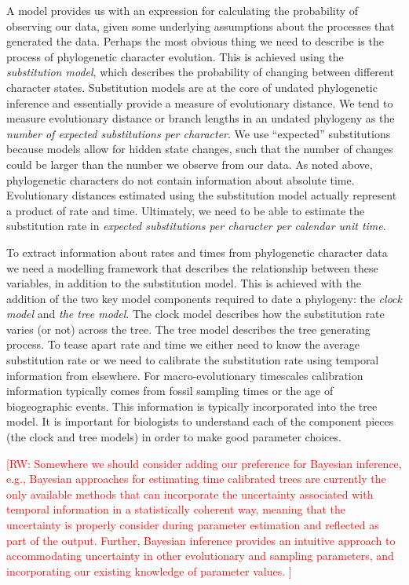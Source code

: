 \documentclass[11pt]{article}
\newcommand\blankpage{%
    \null
    \thispagestyle{empty}%
    \addtocounter{page}{-1}%
    \newpage}
\newcommand{\rw}[1]{{\textcolor{red}{[RW: #1]}}} %
\begin{document}
A model provides us with an expression for calculating the probability of observing our data, given some underlying assumptions about the processes that generated the data. 
Perhaps the most obvious thing we need to describe is the process of phylogenetic character evolution.
This is achieved using the \textit{substitution model}, which describes the probability of changing between different character states.
Substitution models are at the core of undated phylogenetic inference and essentially provide a measure of evolutionary distance.
We tend to measure evolutionary distance or branch lengths in an undated phylogeny as the \textit{number of expected substitutions per character}. We use ``expected'' substitutions because models allow for hidden state changes, such that the number of changes could be larger than the number we observe from our data.
As noted above, phylogenetic characters do not contain information about absolute time. Evolutionary distances estimated using the substitution model actually represent a product of rate and time.
Ultimately, we need to be able to estimate the substitution rate in \textit{expected substitutions per character per calendar unit time}.

To extract information about rates and times from phylogenetic character data we need a modelling framework that describes the  relationship between these variables, in addition to the substitution model.
This is achieved with the addition of the two key model components required to date a phylogeny: the \textit{clock model} and \textit{the tree model}.
The clock model describes how the substitution rate varies (or not) across the tree.
The tree model describes the tree generating process.
To tease apart rate and time we either need to know the average substitution rate or we need to calibrate the substitution rate using temporal information from elsewhere.
For macro-evolutionary timescales calibration information typically comes from fossil sampling times or the age of biogeographic events. This information is typically incorporated into the tree model.
It is important for biologists to understand each of the component pieces (the clock and tree models) in order to make good parameter choices.

\clearpage
\afterpage{\blankpage}


\rw{Somewhere we should consider adding our preference for Bayesian inference, e.g., Bayesian approaches 
for estimating time calibrated trees are currently the only available methods that can incorporate the uncertainty associated with temporal information in a statistically coherent way, meaning that the uncertainty is properly consider during parameter estimation and reflected as part of the output.
Further, Bayesian inference provides an intuitive approach to accommodating uncertainty in other evolutionary and sampling parameters, and incorporating our existing knowledge of parameter values.
}
\end{document}
